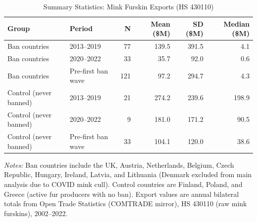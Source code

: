 \begin{table}[t]
\begin{threeparttable}
\centering
\caption{Summary Statistics: Mink Furskin Exports (HS 430110)}
\label{tab:summ_stats}
\begin{tabular}{llrrrr}
\toprule
Group & Period & N & Mean (\$M) & SD (\$M) & Median (\$M) \\
\midrule
Ban countries & 2013--2019 & 77 & 139.5 & 391.5 & 4.1 \\
Ban countries & 2020--2022 & 33 & 35.7 & 92.0 & 0.6 \\
Ban countries & Pre-first ban wave & 121 & 97.2 & 294.7 & 4.3 \\
Control (never banned) & 2013--2019 & 21 & 274.2 & 239.6 & 198.9 \\
Control (never banned) & 2020--2022 & 9 & 181.0 & 171.2 & 90.5 \\
Control (never banned) & Pre-first ban wave & 33 & 104.1 & 120.0 & 38.6 \\
\bottomrule
\end{tabular}
\begin{tablenotes}
\item \textit{Notes:} Ban countries include the UK, Austria, Netherlands, Belgium, Czech Republic, Hungary, Ireland, Latvia, and Lithuania (Denmark excluded from main analysis due to COVID mink cull). Control countries are Finland, Poland, and Greece (active fur producers with no ban). Export values are annual bilateral totals from Open Trade Statistics (COMTRADE mirror), HS 430110 (raw mink furskins), 2002--2022.
\end{tablenotes}
\end{threeparttable}
\end{table}
